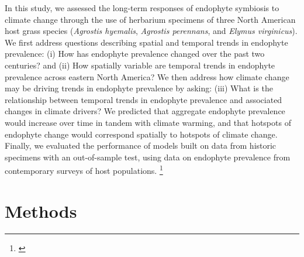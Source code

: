 \documentclass[11pt]{article}
\newcommand{\tom}[2]{{\color{red}{#1}}\footnote{\textit{\color{red}{#2}}}}
\begin{document}
In this study, we assessed the long-term responses of endophyte symbiosis to climate change through the use of herbarium specimens of three North American host grass species (\emph{Agrostis hyemalis}, \emph{Agrostis perennans}, and \emph{Elymus virginicus}).
We first address questions describing spatial and temporal trends in endophyte prevalence: (i) How has endophyte prevalence changed over the past two centuries? and (ii) How spatially variable are temporal trends in endophyte prevalence across eastern North America?
We then address how climate change may be driving trends in endophyte prevalence by asking: (iii) What is the relationship between temporal trends in endophyte prevalence and associated changes in climate drivers?
We predicted that aggregate endophyte prevalence would increase over time in tandem with climate warming, and that hotspots of endophyte change would correspond spatially to hotspots of climate change. 
Finally, we evaluated the performance of models built on data from historic specimens with an out-of-sample test, using data on endophyte prevalence from contemporary surveys of host populations. 
\tom{To answer these questions we examined a total of 2,346 specimens collected across eastern North America between 1824 and 2019.}{Since the preceding sentence is about the out of sample test, maybe include here the numbers of individuals and populations that the historical predictions were tested against?}
	
\section*{Methods}
\end{document}
